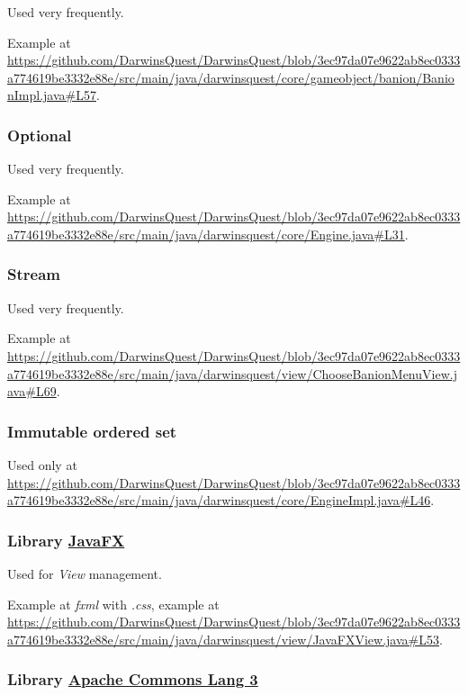 \documentclass[12pt, a4paper]{report}
\begin{document}
        Used very frequently.

        Example at \url{https://github.com/DarwinsQuest/DarwinsQuest/blob/3ec97da07e9622ab8ec0333a774619be3332e88e/src/main/java/darwinsquest/core/gameobject/banion/BanionImpl.java#L57}.

        \subsubsection{Optional}

        Used very frequently.

        Example at \url{https://github.com/DarwinsQuest/DarwinsQuest/blob/3ec97da07e9622ab8ec0333a774619be3332e88e/src/main/java/darwinsquest/core/Engine.java#L31}.

        \subsubsection{Stream}

        Used very frequently.

        Example at \url{https://github.com/DarwinsQuest/DarwinsQuest/blob/3ec97da07e9622ab8ec0333a774619be3332e88e/src/main/java/darwinsquest/view/ChooseBanionMenuView.java#L69}.

        \subsubsection{Immutable ordered set}

        Used only at \url{https://github.com/DarwinsQuest/DarwinsQuest/blob/3ec97da07e9622ab8ec0333a774619be3332e88e/src/main/java/darwinsquest/core/EngineImpl.java#L46}.

        \subsubsection{Library \href{https://openjfx.io/}{JavaFX}}
        
        Used for \emph{View} management.

        Example at \textit{fxml} with \textit{.css}, example at \url{https://github.com/DarwinsQuest/DarwinsQuest/blob/3ec97da07e9622ab8ec0333a774619be3332e88e/src/main/java/darwinsquest/view/JavaFXView.java#L53}.
        
        \subsubsection{Library \href{https://commons.apache.org/proper/commons-lang/}{Apache Commons Lang 3}}
        
\end{document}
